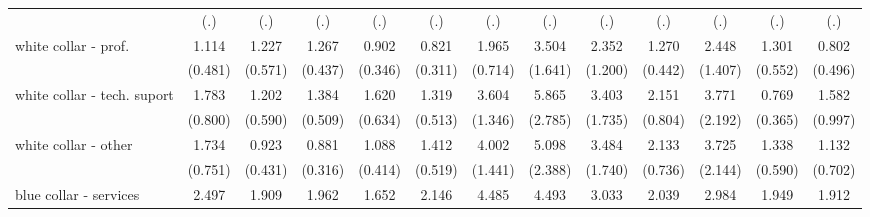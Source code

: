 {\begin{tabular}{l*{12}{c}}
                    &         (.)         &         (.)         &         (.)         &         (.)         &         (.)         &         (.)         &         (.)         &         (.)         &         (.)         &         (.)         &         (.)         &         (.)         \\
[1em]
white collar - prof.&       1.114         &       1.227         &       1.267         &       0.902         &       0.821         &       1.965         &       3.504\sym{**} &       2.352         &       1.270         &       2.448         &       1.301         &       0.802         \\
                    &     (0.481)         &     (0.571)         &     (0.437)         &     (0.346)         &     (0.311)         &     (0.714)         &     (1.641)         &     (1.200)         &     (0.442)         &     (1.407)         &     (0.552)         &     (0.496)         \\
[1em]
white collar - tech. suport&       1.783         &       1.202         &       1.384         &       1.620         &       1.319         &       3.604\sym{***}&       5.865\sym{***}&       3.403\sym{*}  &       2.151\sym{*}  &       3.771\sym{*}  &       0.769         &       1.582         \\
                    &     (0.800)         &     (0.590)         &     (0.509)         &     (0.634)         &     (0.513)         &     (1.346)         &     (2.785)         &     (1.735)         &     (0.804)         &     (2.192)         &     (0.365)         &     (0.997)         \\
[1em]
white collar - other&       1.734         &       0.923         &       0.881         &       1.088         &       1.412         &       4.002\sym{***}&       5.098\sym{***}&       3.484\sym{*}  &       2.133\sym{*}  &       3.725\sym{*}  &       1.338         &       1.132         \\
                    &     (0.751)         &     (0.431)         &     (0.316)         &     (0.414)         &     (0.519)         &     (1.441)         &     (2.388)         &     (1.740)         &     (0.736)         &     (2.144)         &     (0.590)         &     (0.702)         \\
[1em]
blue collar - services&       2.497\sym{*}  &       1.909         &       1.962         &       1.652         &       2.146\sym{*}  &       4.485\sym{***}&       4.493\sym{**} &       3.033\sym{*}  &       2.039\sym{*}  &       2.984         &       1.949         &       1.912         \\

\end{tabular}}
